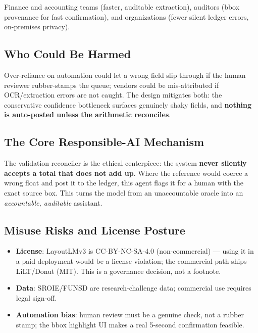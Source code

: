 \documentclass[12pt,a4paper]{article}
\begin{document}
Finance and accounting teams (faster, auditable extraction), auditors (bbox provenance
for fast confirmation), and organizations (fewer silent ledger errors, on-premises
privacy).

\subsection{Who Could Be Harmed}

Over-reliance on automation could let a wrong field slip through if the human reviewer
rubber-stamps the queue; vendors could be mis-attributed if OCR/extraction errors are
not caught. The design mitigates both: the conservative confidence bottleneck surfaces
genuinely shaky fields, and \textbf{nothing is auto-posted unless the arithmetic
reconciles}.

\subsection{The Core Responsible-AI Mechanism}

The validation reconciler is the ethical centerpiece: the system \textbf{never silently
accepts a total that does not add up}. Where the reference would coerce a wrong float and
post it to the ledger, this agent flags it for a human with the exact source box. This
turns the model from an unaccountable oracle into an \emph{accountable, auditable}
assistant.

\subsection{Misuse Risks and License Posture}

\begin{itemize}\setlength\itemsep{0.15em}
  \item \textbf{License}: LayoutLMv3 is CC-BY-NC-SA-4.0 (non-commercial) --- using it in a paid deployment would be a license violation; the commercial path ships LiLT/Donut (MIT). This is a governance decision, not a footnote.
  \item \textbf{Data}: SROIE/FUNSD are research-challenge data; commercial use requires legal sign-off.
  \item \textbf{Automation bias}: human review must be a genuine check, not a rubber stamp; the bbox highlight UI makes a real 5-second confirmation feasible.
\end{itemize}
\end{document}
